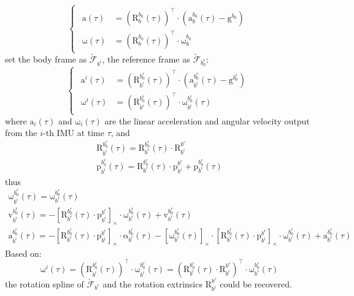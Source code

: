\documentclass[12pt, onecolumn]{article}
\newcommand\normf{\fangsong}
\newcommand\liehat[1]{\left[ #1 \right]_\times}
\newcommand\bsm[1]{\boldsymbol{\mathrm{#1}}}
\newcommand\rotation[2]{{\bsm{R}_{#1}^{#2}}}
\newcommand\angvel[2]{{\bsm{\omega}_{#1}^{#2}}}
\newcommand\angacce[2]{{\bsm{\alpha}_{#1}^{#2}}}
\newcommand\translation[2]{{\bsm{p}_{#1}^{#2}}}
\newcommand\linvel[2]{{\bsm{v}_{#1}^{#2}}}
\newcommand\linacce[2]{{\bsm{a}_{#1}^{#2}}}
\newcommand\gravity[1]{{\bsm{g}^{#1}}}
\newcommand\coordframe[1]{\underrightarrow{\mathcal{F}}_{#1}}
\begin{document}
	\section{\normf{Dynamics}}
	\normf
	\begin{equation}
	\begin{cases}
	\begin{aligned}
	\bsm{a}(\tau)&=\left(\rotation{b}{b_0}(\tau) \right) ^\top\cdot\left(\linacce{b}{b_0}(\tau)-\gravity{b_0}\right) 
	\\
	\bsm{\omega}(\tau)&=\left(\rotation{b}{b_0}(\tau) \right) ^\top\cdot\angvel{b}{b_0}
	\end{aligned}
	\end{cases}
	\end{equation}
	set the body frame as $\coordframe{b^i}$, the reference frame as $\coordframe{b^r_0}$:
	\begin{equation}
	\begin{cases}
	\begin{aligned}
	\bsm{a}^i(\tau)&=\left(\rotation{b^i}{b^r_0}(\tau) \right) ^\top\cdot\left(\linacce{b^i}{b^r_0}(\tau)-\gravity{b^r_0}\right) 
	\\
	\bsm{\omega}^i(\tau)&=\left(\rotation{b^i}{b^r_0}(\tau) \right) ^\top\cdot\angvel{b^i}{b^r_0}(\tau)
	\end{aligned}
	\end{cases}
	\end{equation}
	where $\bsm{a}_i(\tau)$ and $\bsm{\omega}_i(\tau)$ are the linear acceleration and angular velocity output from the $i$-th IMU at time $\tau$, and
	\begin{equation}
	\begin{gathered}
	\rotation{b^i}{b^r_0}(\tau)=\rotation{b^r}{b^r_0}(\tau)\cdot\rotation{b^i}{b^r}
	\\
	\translation{b^i}{b^r_0}(\tau)=\rotation{b^r}{b^r_0}(\tau)\cdot\translation{b^i}{b^r}+\translation{b^r}{b^r_0}(\tau)
	\end{gathered}
	\end{equation}
	thus
	\begin{equation}
	\begin{gathered}
	\angvel{b^i}{b^r_0}(\tau)=\angvel{b^r}{b^r_0}(\tau)
	\\
	\linvel{b^i}{b^r_0}(\tau)=-\liehat{\rotation{b^r}{b^r_0}(\tau)\cdot\translation{b^i}{b^r}}\cdot\angvel{b^r}{b^r_0}(\tau)+\linvel{b^r}{b^r_0}(\tau)
	\\
	\linacce{b^i}{b^r_0}(\tau)=-\liehat{\rotation{b^r}{b^r_0}(\tau)\cdot\translation{b^i}{b^r}}\cdot\angacce{b^r}{b^r_0}(\tau)
	-\liehat{\angvel{b^r}{b^r_0}(\tau)}\cdot
	\liehat{\rotation{b^r}{b^r_0}(\tau)\cdot\translation{b^i}{b^r}}\cdot\angvel{b^r}{b^r_0}(\tau)+\linacce{b^r}{b^r_0}(\tau)
	\end{gathered}
	\end{equation}
	Based on:
	\begin{equation}
	\bsm{\omega}^i(\tau)=\left(\rotation{b^i}{b^r_0}(\tau) \right) ^\top\cdot\angvel{b^i}{b^r_0}(\tau)=\left(\rotation{b^r}{b^r_0}(\tau)\cdot\rotation{b^i}{b^r} \right) ^\top\cdot\angvel{b^r}{b^r_0}(\tau)
	\end{equation}
	the rotation spline of $\coordframe{b^r}$ and the rotation extrinsics $\rotation{b^i}{b^r}$ could be recovered.
	
\end{document}
